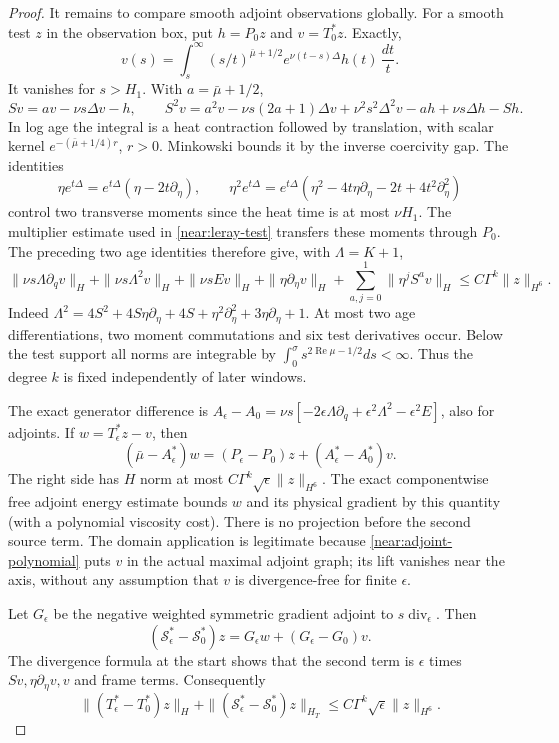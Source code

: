 \begin{proof}
It remains to compare smooth adjoint observations globally. For a smooth
test \(z\) in the observation box, put \(h=P_0z\) and \(v=T_0^*z\).
Exactly,
\[
 v(s)=\int_s^\infty(s/t)^{\bar\mu+1/2}
                e^{\nu(t-s)\Delta}h(t)\,\frac{dt}{t}.
\]
It vanishes for \(s>H_1\). With \(a=\bar\mu+1/2\),
\[
 Sv=av-\nu s\Delta v-h,\qquad
 S^2v=a^2v-\nu s(2a+1)\Delta v+\nu^2s^2\Delta^2v
                         -ah+\nu s\Delta h-Sh.
\]
In log age the integral is a heat contraction followed by translation,
with scalar kernel \(e^{-(\bar\mu+1/4)r}\), \(r>0\).
Minkowski bounds it by the inverse coercivity gap. The identities
\[
 \eta e^{t\Delta}=e^{t\Delta}(\eta-2t\partial_\eta),\qquad
 \eta^2e^{t\Delta}=e^{t\Delta}
       (\eta^2-4t\eta\partial_\eta-2t+4t^2\partial_\eta^2)
\]
control two transverse moments since the heat time is at most \(\nu H_1\).
The multiplier estimate used in \eqref{near:leray-test} transfers these
moments through \(P_0\). The preceding two age identities therefore give,
with \(\Lambda=K+1\),
\begin{equation}\label{near:adjoint-polynomial}
 \|\nu s\Lambda\partial_qv\|_H+\|\nu s\Lambda^2v\|_H+\|\nu sEv\|_H
 +\|\eta\partial_\eta v\|_H
 +\sum_{a,j=0}^1\|\eta^jS^av\|_H
 \le C\Gamma^k\|z\|_{H^6}.
\end{equation}
Indeed \(\Lambda^2=4S^2+4S\eta\partial_\eta+4S+
\eta^2\partial_\eta^2+3\eta\partial_\eta+1\).
At most two age differentiations, two moment commutations and six test
derivatives occur. Below the test support all norms are integrable by
\(\int_0^\sigma s^{2\operatorname{Re}\mu-1/2}ds<\infty\).
Thus the degree \(k\) is fixed independently of later windows.

The exact generator difference is
\(A_\epsilon-A_0=\nu s[-2\epsilon\Lambda\partial_q+
\epsilon^2\Lambda^2-\epsilon^2E]\), also for adjoints. If
\(w=T_\epsilon^*z-v\), then
\[
 (\bar\mu-A_\epsilon^*)w
 =(P_\epsilon-P_0)z+(A_\epsilon^*-A_0^*)v.
\]
The right side has \(H\) norm at most
\(C\Gamma^k\sqrt\epsilon\|z\|_{H^6}\).
The exact componentwise free adjoint energy estimate bounds \(w\)
and its physical gradient by this quantity (with a polynomial viscosity
cost). There is no projection before the second source term.
The domain application is legitimate because
\eqref{near:adjoint-polynomial} puts \(v\) in the actual maximal adjoint
graph; its lift vanishes near the axis, without any assumption that
\(v\) is divergence-free for finite \(\epsilon\).

Let \(G_\epsilon\) be the negative weighted symmetric gradient adjoint
to \(s\operatorname{div}_\epsilon\). Then
\[
 (\mathcal S_\epsilon^*-\mathcal S_0^*)z
   =G_\epsilon w+(G_\epsilon-G_0)v.
\]
The divergence formula at the start shows that the second term is
\(\epsilon\) times \(Sv,\eta\partial_\eta v,v\) and frame terms.
Consequently
\begin{equation}\label{near:smooth-adjoint-comparison}
 \|(T_\epsilon^*-T_0^*)z\|_H
 +\|(\mathcal S_\epsilon^*-\mathcal S_0^*)z\|_{H_T}
 \le C\Gamma^k\sqrt\epsilon\|z\|_{H^6}.
\end{equation}


\end{proof}
